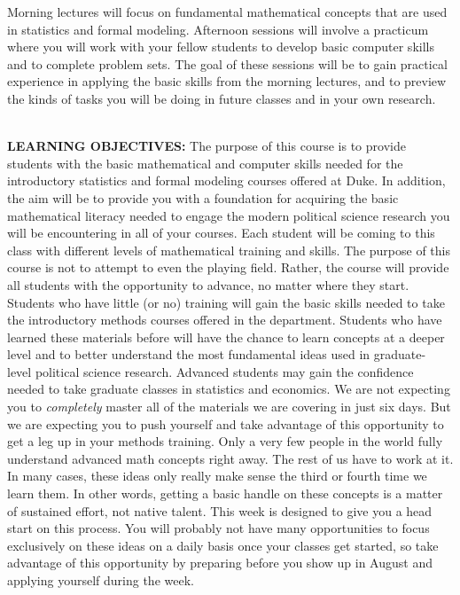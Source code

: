 \documentclass[12pt,a4paper]{article}
\begin{document}
Morning lectures will focus on fundamental mathematical concepts that are used in statistics and formal modeling. Afternoon sessions will involve a practicum where you will work with your fellow students to develop basic computer skills and to complete problem sets. The goal of these sessions will be to gain practical experience in applying the basic skills from the morning lectures, and to preview the kinds of tasks you will be doing in future classes and in your own research.

\mbox{}\\

\textbf{LEARNING OBJECTIVES:} The purpose of this course is to provide students with the basic mathematical and computer skills needed for the introductory statistics and formal modeling courses offered at Duke. In addition, the aim will be to provide you with a foundation for acquiring the basic mathematical literacy needed to engage the modern political science research you will be encountering in all of your courses.
Each student will be coming to this class with different levels of mathematical training and skills. The purpose of this course is not to attempt to even the playing field. Rather, the course will provide all students with the opportunity to advance, no matter where they start. Students who have little (or no) training will gain the basic skills needed to take the introductory methods courses offered in the department. Students who have learned these materials before will have the chance to learn concepts at a deeper level and to better understand the most fundamental ideas used in graduate- level political science research. Advanced students may gain the confidence needed to take graduate classes in statistics and economics.
We are not expecting you to \textit{completely} master all of the materials we are covering in just six days. But we are expecting you to push yourself and take advantage of this opportunity to get a leg up in your methods training. Only a very few people in the world fully understand advanced math concepts right away. The rest of us have to work at it. In many cases, these ideas only really make sense the third or fourth time we learn them. In other words, getting a basic handle on these concepts is a matter of sustained effort, not native talent. This week is designed to give you a head start on this process. You will probably not have many opportunities to focus exclusively on these ideas on a daily basis once your classes get started, so take advantage of this opportunity by preparing before you show up in August and applying yourself during the week.\\
\end{document}
